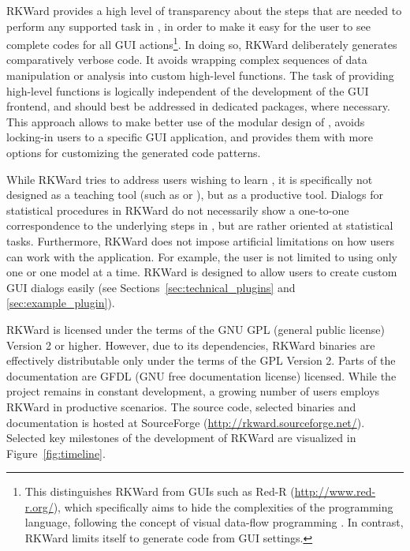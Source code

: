 RKWard provides a high level of transparency about the steps that are needed to
perform any supported task in , in order to make it easy for the user to see
complete codes for all GUI actions\footnote{
  This distinguishes RKWard from  GUIs such as Red-R (\url{http://www.red-r.org/}), which 
  specifically aims to hide the complexities of the  programming language, following the concept of visual data-flow 
  programming \citep{Sutherland1966}. In contrast, RKWard limits itself to generate  code from GUI settings.
}. In doing so, RKWard deliberately generates
comparatively verbose code. It avoids wrapping complex sequences of data
manipulation or analysis into custom high-level  functions. The task of
providing high-level functions is logically independent of the development of the
GUI frontend, and should best be addressed in dedicated  packages, where necessary.
This approach allows to make better use of the modular design of , avoids
locking-in users to a specific GUI application, and provides them with more options for
customizing the generated code patterns.

While RKWard tries to address users wishing to learn , it is specifically not
designed as a teaching tool (such as  or ), but as
a productive tool. Dialogs for statistical procedures in RKWard do not
necessarily show a one-to-one correspondence to the underlying steps in , but are
rather oriented at statistical tasks. Furthermore, RKWard does not impose
artificial limitations on how users can work with the application. For example,
the user is not limited to using only one  or one model at a
time. RKWard is designed to allow users to create custom GUI dialogs
easily (see Sections~\ref{sec:technical_plugins} and \ref{sec:example_plugin}).

RKWard is licensed under the terms of the GNU GPL (general public license) Version 2
or higher. However, due to its dependencies, RKWard binaries are effectively
distributable only under the terms of the GPL Version 2. Parts of the documentation are
GFDL (GNU free documentation license) licensed. While the project remains in constant development, a growing
number of users employs RKWard in productive scenarios. The source code,
selected binaries and documentation is hosted at SourceForge
(\url{http://rkward.sourceforge.net/}). Selected key milestones of the development of RKWard are
visualized in Figure~\ref{fig:timeline}.

